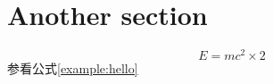 \documentclass[a4paper, 10pt]{book}
\begin{document}
\section{Another section}
\begin{equation}
    \label{example:hello}
    E = m c^2 \times 2
\end{equation}
参看公式\ref{example:hello}
\end{document}
